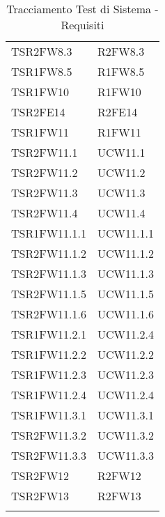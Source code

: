 \begin{longtable}{ m{}<{\centering}  m{}<{\centering} }
	TSR2FW8.3 & R2FW8.3 \\
	TSR1FW8.5 & R1FW8.5 \\
	TSR1FW10 & R1FW10 \\
	TSR2FE14 & R2FE14  \\
	TSR1FW11 & R1FW11 \\
	TSR2FW11.1 & UCW11.1\\
	TSR2FW11.2 & UCW11.2\\
	TSR2FW11.3 & UCW11.3\\
	TSR2FW11.4 & UCW11.4\\
	TSR1FW11.1.1 & UCW11.1.1\\
	TSR2FW11.1.2 & UCW11.1.2\\
	TSR2FW11.1.3 & UCW11.1.3\\
	TSR2FW11.1.5 & UCW11.1.5\\
	TSR2FW11.1.6 & UCW11.1.6\\
	TSR1FW11.2.1 & UCW11.2.4\\
	TSR1FW11.2.2 & UCW11.2.2\\
	TSR1FW11.2.3 & UCW11.2.3\\
	TSR1FW11.2.4 & UCW11.2.4\\
	TSR1FW11.3.1 & UCW11.3.1\\
	TSR2FW11.3.2 & UCW11.3.2\\
	TSR2FW11.3.3 & UCW11.3.3\\
	TSR2FW12 & R2FW12 \\
	TSR2FW13 & R2FW13 \\

\caption{Tracciamento Test di Sistema - Requisiti}
\end{longtable}